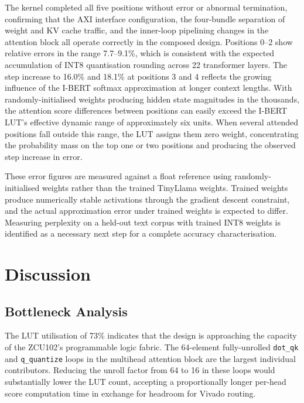 The kernel completed all five positions without error or abnormal
termination, confirming that the AXI interface configuration, the four-bundle
separation of weight and KV cache traffic, and the inner-loop pipelining
changes in the attention block all operate correctly in the composed design. Positions 0--2 show relative errors in the range 7.7--9.1\%, which is
consistent with the expected accumulation of INT8 quantisation rounding across
22 transformer layers. The step increase to 16.0\% and 18.1\% at positions 3
and 4 reflects the growing influence of the I-BERT softmax approximation at
longer context lengths. With randomly-initialised weights producing hidden state
magnitudes in the thousands, the attention score differences between positions
can easily exceed the I-BERT LUT's effective dynamic range of approximately six
units. When several attended positions fall outside this range, the LUT assigns
them zero weight, concentrating the probability mass on the top one or two
positions and producing the observed step increase in error.

These error figures are measured against a float reference using
randomly-initialised weights rather than the trained TinyLlama weights. Trained
weights produce numerically stable activations through the gradient descent
constraint, and the actual approximation error under trained weights is expected
to differ. Measuring perplexity on a held-out text corpus with trained INT8
weights is identified as a necessary next step for a complete accuracy
characterisation.

\section{Discussion}
\label{sec:discussion}

\subsection{Bottleneck Analysis}
\label{subsec:bottleneck}



The LUT utilisation of 73\% indicates that the design is approaching the
capacity of the ZCU102's programmable logic fabric. The 64-element
fully-unrolled \texttt{dot\_qk} and \texttt{q\_quantize} loops in the
multihead attention block are the largest individual contributors. Reducing
the unroll factor from 64 to 16 in these loops would substantially lower the
LUT count, accepting a proportionally longer per-head score computation time
in exchange for headroom for Vivado routing.

